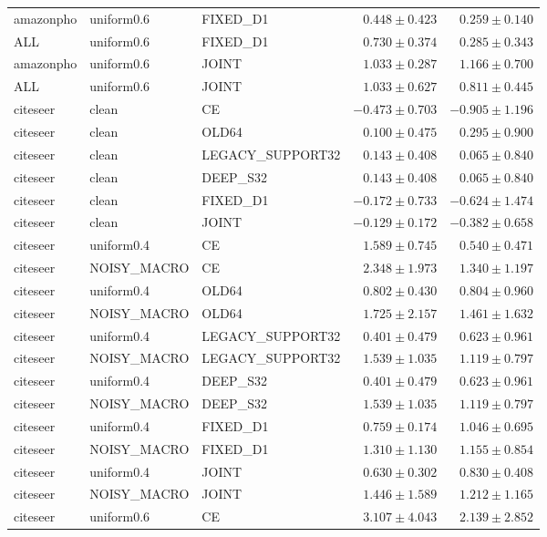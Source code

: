 \begin{longtable}{lllrr}
amazonpho & uniform0.6 & FIXED\_D1 & $0.448 \pm 0.423$ & $0.259 \pm 0.140$ \\
ALL & uniform0.6 & FIXED\_D1 & $0.730 \pm 0.374$ & $0.285 \pm 0.343$ \\
amazonpho & uniform0.6 & JOINT & $1.033 \pm 0.287$ & $1.166 \pm 0.700$ \\
ALL & uniform0.6 & JOINT & $1.033 \pm 0.627$ & $0.811 \pm 0.445$ \\
citeseer & clean & CE & $-0.473 \pm 0.703$ & $-0.905 \pm 1.196$ \\
citeseer & clean & OLD64 & $0.100 \pm 0.475$ & $0.295 \pm 0.900$ \\
citeseer & clean & LEGACY\_SUPPORT32 & $0.143 \pm 0.408$ & $0.065 \pm 0.840$ \\
citeseer & clean & DEEP\_S32 & $0.143 \pm 0.408$ & $0.065 \pm 0.840$ \\
citeseer & clean & FIXED\_D1 & $-0.172 \pm 0.733$ & $-0.624 \pm 1.474$ \\
citeseer & clean & JOINT & $-0.129 \pm 0.172$ & $-0.382 \pm 0.658$ \\
citeseer & uniform0.4 & CE & $1.589 \pm 0.745$ & $0.540 \pm 0.471$ \\
citeseer & NOISY\_MACRO & CE & $2.348 \pm 1.973$ & $1.340 \pm 1.197$ \\
citeseer & uniform0.4 & OLD64 & $0.802 \pm 0.430$ & $0.804 \pm 0.960$ \\
citeseer & NOISY\_MACRO & OLD64 & $1.725 \pm 2.157$ & $1.461 \pm 1.632$ \\
citeseer & uniform0.4 & LEGACY\_SUPPORT32 & $0.401 \pm 0.479$ & $0.623 \pm 0.961$ \\
citeseer & NOISY\_MACRO & LEGACY\_SUPPORT32 & $1.539 \pm 1.035$ & $1.119 \pm 0.797$ \\
citeseer & uniform0.4 & DEEP\_S32 & $0.401 \pm 0.479$ & $0.623 \pm 0.961$ \\
citeseer & NOISY\_MACRO & DEEP\_S32 & $1.539 \pm 1.035$ & $1.119 \pm 0.797$ \\
citeseer & uniform0.4 & FIXED\_D1 & $0.759 \pm 0.174$ & $1.046 \pm 0.695$ \\
citeseer & NOISY\_MACRO & FIXED\_D1 & $1.310 \pm 1.130$ & $1.155 \pm 0.854$ \\
citeseer & uniform0.4 & JOINT & $0.630 \pm 0.302$ & $0.830 \pm 0.408$ \\
citeseer & NOISY\_MACRO & JOINT & $1.446 \pm 1.589$ & $1.212 \pm 1.165$ \\
citeseer & uniform0.6 & CE & $3.107 \pm 4.043$ & $2.139 \pm 2.852$ \\

\end{longtable}
